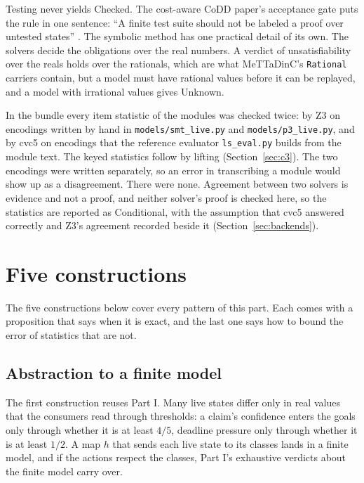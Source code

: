 \documentclass[11pt]{article}
\newcommand{\fpath}[1]{\nolinkurl{#1}}
\newcommand{\code}[1]{\texttt{#1}}
\theoremstyle{definition}
\theoremstyle{plain}
\begin{document}
Testing never yields Checked. The cost-aware CoDD paper's acceptance gate puts the rule in one
sentence: ``A finite test suite should not be labeled a proof over untested states''
\cite[Appendix~C.3]{codd}. The symbolic method has one practical detail of its own. The solvers
decide the obligations over the real numbers. A verdict of unsatisfiability over the reals holds
over the rationals, which are what MeTTaDinC's \code{Rational} carriers contain, but a model must have
rational values before it can be replayed, and a model with irrational values gives Unknown.

In the bundle every item statistic of the modules was checked twice: by Z3 on encodings written by
hand in \fpath{models/smt_live.py} and \fpath{models/p3_live.py}, and by cvc5 on encodings that the
reference evaluator \fpath{ls_eval.py} builds from the module text. The keyed statistics follow by
lifting (Section~\ref{sec:c3}). The two encodings were written separately, so an error in
transcribing a module would show up as a disagreement. There were none. Agreement between two
solvers is evidence and not a proof, and neither solver's proof is checked here, so the statistics
are reported as Conditional, with the assumption that cvc5 answered correctly and Z3's agreement
recorded beside it (Section~\ref{sec:backends}).

\section{Five constructions}\label{sec:constructions}

The five constructions below cover every pattern of this part. Each comes with a proposition that
says when it is exact, and the last one says how to bound the error of statistics that are not.

\subsection{Abstraction to a finite model}\label{sec:c1}

The first construction reuses Part I. Many live states differ only in real values that the consumers
read through thresholds: a claim's confidence enters the goals only through whether it is at least
$4/5$, deadline pressure only through whether it is at least $1/2$. A map $h$ that sends each live
state to its classes lands in a finite model, and if the actions respect the classes, Part I's
exhaustive verdicts about the finite model carry over.
\end{document}
